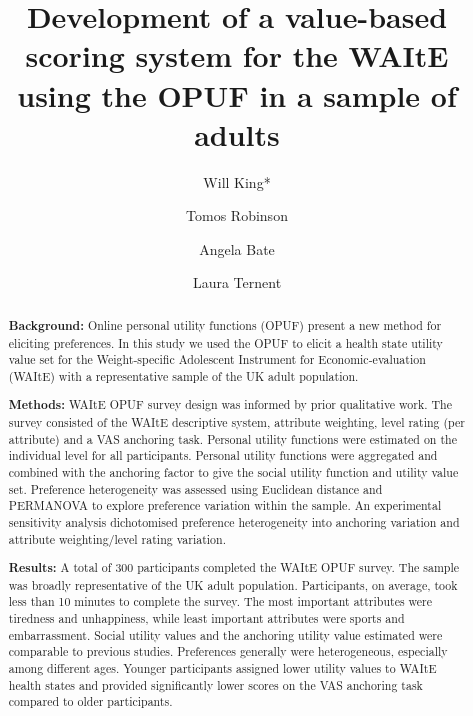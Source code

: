 \documentclass[
  number,
  preprint]{elsarticle}
\begin{document}
\begin{frontmatter}
\title{Development of a value-based scoring system for the WAItE using
the OPUF in a sample of adults}
\author[1]{Will King*%
%
}
\author[1]{Tomos Robinson%
%
}

\author[2]{Angela Bate%
%
}

\author[1]{Laura Ternent%
%
}







        
\begin{abstract}
\textbf{Background:} Online personal utility functions (OPUF) present a
new method for eliciting preferences. In this study we used the OPUF to
elicit a health state utility value set for the Weight-specific
Adolescent Instrument for Economic-evaluation (WAItE) with a
representative sample of the UK adult population.

\textbf{Methods:} WAItE OPUF survey design was informed by prior
qualitative work. The survey consisted of the WAItE descriptive system,
attribute weighting, level rating (per attribute) and a VAS anchoring
task. Personal utility functions were estimated on the individual level
for all participants. Personal utility functions were aggregated and
combined with the anchoring factor to give the social utility function
and utility value set. Preference heterogeneity was assessed using
Euclidean distance and PERMANOVA to explore preference variation within
the sample. An experimental sensitivity analysis dichotomised preference
heterogeneity into anchoring variation and attribute weighting/level
rating variation.

\textbf{Results:} A total of 300 participants completed the WAItE OPUF
survey. The sample was broadly representative of the UK adult
population. Participants, on average, took less than 10 minutes to
complete the survey. The most important attributes were tiredness and
unhappiness, while least important attributes were sports and
embarrassment. Social utility values and the anchoring utility value
estimated were comparable to previous studies. Preferences generally
were heterogeneous, especially among different ages. Younger
participants assigned lower utility values to WAItE health states and
provided significantly lower scores on the VAS anchoring task compared
to older participants.


\end{abstract}
\end{frontmatter}
\end{document}
